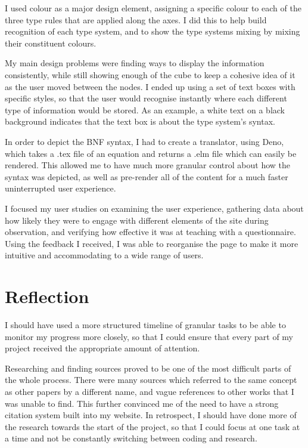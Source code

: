\documentclass{l4proj}
\begin{document}
I used colour as a major design element, assigning a specific colour to each of the three type rules that are applied along the axes.  I did this to help build recognition of each type system, and to show the type systems mixing by mixing their constituent colours.

My main design problems were finding ways to display the information consistently, while still showing enough of the cube to keep a cohesive idea of it as the user moved between the nodes.  I ended up using a set of text boxes with specific styles, so that the user would recognise instantly where each different type of information would be stored.  As an example, a white text on a black background indicates that the text box is about the type system's syntax.

In order to depict the BNF syntax, I had to create a translator, using Deno, which takes a .tex file of an equation and returns a .elm file which can easily be rendered.  This allowed me to have much more granular control about how the syntax was depicted, as well as pre-render all of the content for a much faster uninterrupted user experience.

I focused my user studies on examining the user experience, gathering data about how likely they were to engage with different elements of the site during observation, and verifying how effective it was at teaching with a questionnaire.  Using the feedback I received, I was able to reorganise the page to make it more intuitive and accommodating to a wide range of users.

\section{Reflection}

I should have used a more structured timeline of granular tasks to be able to monitor my progress more closely, so that I could ensure that every part of my project received the appropriate amount of attention. 

Researching and finding sources proved to be one of the most difficult parts of the whole process.  There were many sources which referred to the same concept as other papers by a different name, and vague references to other works that I was unable to find.  This further convinced me of the need to have a strong citation system built into my website.  In retrospect, I should have done more of the research towards the start of the project, so that I could focus at one task at a time and not be constantly switching between coding and research.
\end{document}
